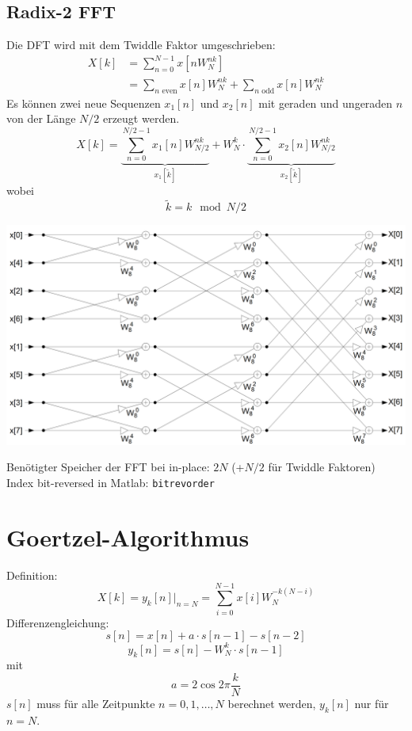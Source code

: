 \subsection{Radix-2 FFT}
Die DFT wird mit dem Twiddle Faktor umgeschrieben:
\[\begin{aligned} X[k] &= \sum_{n=0}^{N-1} x[nW_N^{nk}]\\
	&= \sum_{n \textrm{ even}} x[n]W_N^{nk} + \sum_{n\textrm{ odd}}x[n]W_N^{nk}
\end{aligned}\]
Es können zwei neue Sequenzen $x_1[n]$ und $x_2[n]$ mit geraden und ungeraden
$n$ von der Länge $N/2$ erzeugt werden.
\[ X[k] = \underbrace{\sum_{n=0}^{N/2-1}x_1[n]W_{N/2}^{nk}}_{x_1[\tilde{k}]} +
	W_N^k\cdot \underbrace{\sum_{n=0}^{N/2-1} x_2[n]W_{N/2}^{nk}}_
	{{x_2[\tilde{k}]}} \]
wobei
\[ \tilde{k} = k\mod N/2 \]

\begin{center}
	\includegraphics[scale=.7]{../fig/fft}
\end{center}
Benötigter Speicher der FFT bei in-place: $2N$ (+$N/2$ für Twiddle Faktoren)
Index bit-reversed in Matlab: \verb|bitrevorder|

\section{Goertzel-Algorithmus}
Definition:
\[ X[k] = y_k[n]|_{n=N} = \sum_{i=0}^{N-1}x[i]W_N^{-k(N-i)} \]
Differenzengleichung:
\[ s[n] = x[n] + a \cdot s[n-1] - s[n-2] \]
\[ y_k[n] = s[n] - W_N^k \cdot s[n-1] \]
mit 
\[ a= 2\cos 2\pi\frac{k}{N} \]
$s[n]$ muss für alle Zeitpunkte $n=0,1,\ldots,N$ berechnet werden, $y_k[n]$
nur für $n=N$.

